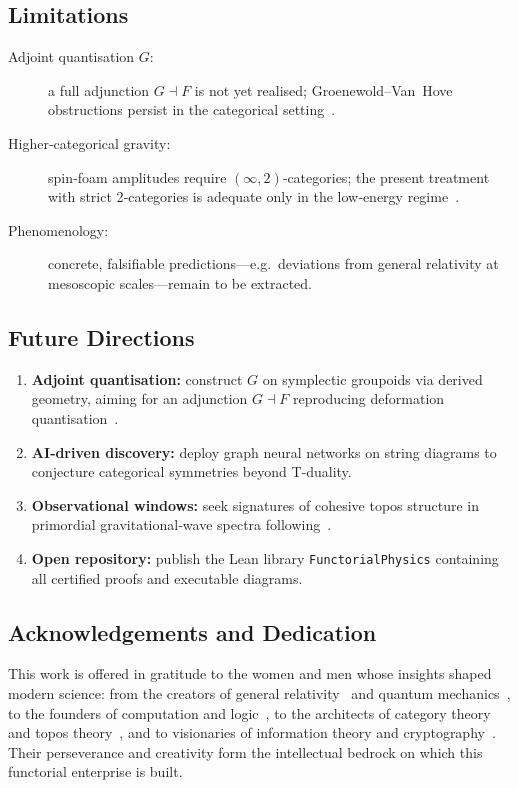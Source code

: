 \subsection*{Limitations}
\begin{description}
    \item[Adjoint quantisation $G$:] a full adjunction $G\dashv F$ is not yet realised; Groenewold--Van~Hove obstructions persist in the categorical setting~\cite{Groenewold1946,VanHove1951}.
    \item[Higher‑categorical gravity:] spin‑foam amplitudes require $(\infty,2)$‑categories; the present treatment with strict 2‑categories is adequate only in the low‑energy regime~\cite{Baez2009}.
    \item[Phenomenology:] concrete, falsifiable predictions—e.g.~deviations from general relativity at mesoscopic scales—remain to be extracted.
\end{description}

\subsection*{Future Directions}
\begin{enumerate}
    \item \textbf{Adjoint quantisation:} construct $G$ on symplectic groupoids via derived geometry, aiming for an adjunction $G\dashv F$ reproducing deformation quantisation~\cite{Kontsevich2003}.
    \item \textbf{AI‑driven discovery:} deploy graph neural networks on string diagrams to conjecture categorical symmetries beyond T‑duality.
    \item \textbf{Observational windows:} seek signatures of cohesive topos structure in primordial gravitational‑wave spectra following~\cite{Schreiber2018}.
    \item \textbf{Open repository:} publish the Lean library \texttt{FunctorialPhysics} containing all certified proofs and executable diagrams.
\end{enumerate}

\subsection*{Acknowledgements and Dedication}
This work is offered in gratitude to the women and men whose insights shaped modern science: from the creators of general relativity~\cite{Einstein1915} and quantum mechanics~\cite{Dirac1928}, to the founders of computation and logic~\cite{Church1936,Turing1936}, to the architects of category theory and topos theory~\cite{Grothendieck1957,Lawvere1963}, and to visionaries of information theory and cryptography~\cite{Shannon1948,DiffieHellman1976}.  Their perseverance and creativity form the intellectual bedrock on which this functorial enterprise is built.

